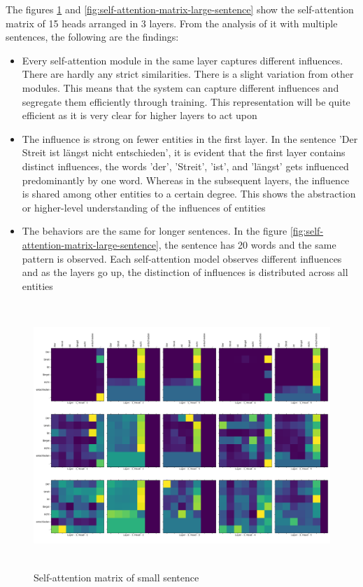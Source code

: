 \documentclass[a4paper, 11pt]{article}
\begin{document}
The figures \ref{fig:self-attention-matrix-small-sentence} and \ref{fig:self-attention-matrix-large-sentence} show the self-attention matrix of 15 heads arranged in 3 layers. From the analysis of it with multiple sentences, the following are the findings:

\begin{itemize}
\item Every self-attention module in the same layer captures different influences. There are hardly any strict similarities. There is a slight variation from other modules. This means that the system can capture different influences and segregate them efficiently through training. This representation will be quite efficient as it is very clear for higher layers to act upon 
\item  The influence is strong on fewer entities in the first layer. In the sentence 'Der Streit ist längst nicht entschieden', it is evident that the first layer contains distinct influences, the words 'der', 'Streit', 'ist', and 'längst' gets influenced predominantly by one word. Whereas in the subsequent layers, the influence is shared among other entities to a certain degree. This shows the abstraction or higher-level understanding of the influences of entities

\item The behaviors are the same for longer sentences. In the figure \ref{fig:self-attention-matrix-large-sentence}, the sentence has 20 words and the same pattern is observed. Each self-attention model observes different influences and as the layers go up, the distinction of influences is distributed across all entities
\end{itemize}

\begin{figure}[H]
    \centering
    \includegraphics[width=\textwidth,height=10cm,keepaspectratio=true]
    {self-attention-matrix-1.png}
    \caption{
        Self-attention matrix of small sentence
    }
    \label{fig:self-attention-matrix-small-sentence}
\end{figure}
\end{document}

